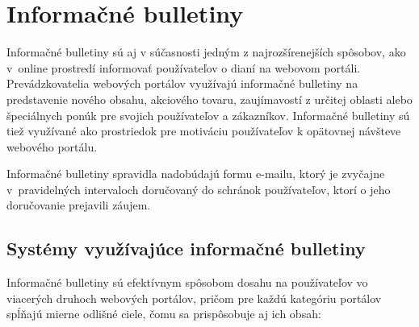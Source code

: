 
\newpage
\chapter{Informačné bulletiny}

Informačné bulletiny sú aj v súčasnosti jedným z najrozšírenejších spôsobov, ako v~online
prostredí informovať používateľov o dianí na webovom portáli. Prevádzkovatelia webových portálov využívajú informačné
bulletiny na predstavenie nového obsahu, akciového tovaru, zaujímavostí z určitej oblasti alebo špeciálnych ponúk pre
svojich používateľov a zákazníkov. Informačné bulletiny sú tiež využívané ako prostriedok pre motiváciu používateľov
k opätovnej návšteve webového portálu.

Informačné bulletiny spravidla nadobúdajú formu e-mailu, ktorý je zvyčajne v~pravidelných intervaloch doručovaný
do schránok používateľov, ktorí o jeho doručovanie prejavili záujem.


\section{Systémy využívajúce informačné bulletiny}

Informačné bulletiny sú efektívnym spôsobom dosahu na používateľov vo viacerých druhoch webových portálov,
pričom pre každú kategóriu portálov spĺňajú mierne odlišné ciele, čomu sa prispôsobuje aj ich obsah:


